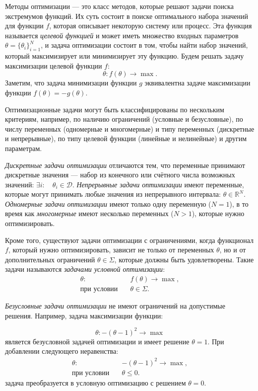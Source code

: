 Методы оптимизации --- это класс методов, которые решают задачи поиска экстремумов функций.
Их суть состоит в поиске оптимального набора значений для функции $f$, которая описывает некоторую систему или процесс.
Эта функция называется \emph{целевой функцией} и может иметь множество входных параметров $\theta = \{\theta_i\}_{i=1}^N$, и задача оптимизации состоит в том, чтобы найти набор значений, который максимизирует или минимизирует эту функцию.
Будем решать задачу максимизации целевой функции $f$:
$$\theta: f(\theta) \to \max.$$
Заметим, что задача минимизации функции $g$ эквивалентна задаче максимизации функции $f(\theta) = -g (\theta)$.

Оптимизационные задачи могут быть классифицированы по нескольким критериям, например, по наличию ограничений (условные и безусловные), по числу переменных (одномерные и многомерные) и типу переменных (дискретные и непрерывные), по типу целевой функции (линейные и нелинейные) и другим параметрам.

\emph{Дискретные задачи оптимизации} отличаются тем, что переменные принимают дискретные значения --- набор из конечного или счётного числа возможных значений: $\exists i:\quad \theta_i \in \mathcal{D}$.
\emph{Непрерывные задачи оптимизации} имеют переменные, которые могут принимать любые значения из непрерывного интервала: $\theta \in \mathbb{R}^N$.
\emph{Одномерные задачи оптимизации} имеют только одну переменную ($N = 1$), в то время как \emph{многомерные} имеют несколько переменных ($N > 1$), которые нужно оптимизировать.

Кроме того, существуют задачи оптимизации с ограничениями, когда функционал $f$, который нужно оптимизировать, зависит не только от переменных $\theta$, но и от дополнительных ограничений $\theta \in \Sigma$, которые должны быть удовлетворены. Такие задачи называются \emph{задачами условной оптимизации}:
\begin{align*}
    \theta:\quad & f(\theta) \to \max, \\        
    \text{при условии}\quad & \theta \in \Sigma.
\end{align*}

\emph{Безусловные задачи оптимизации} не имеют ограничений на допустимые решения. Например, задача максимизации функции:

$$\theta: -(\theta-1)^2 \to \max$$
является безусловной задачей оптимизации и имеет решение $\theta = 1$. При добавлении следующего неравенства:
\begin{align*}
    \theta:\quad & -(\theta-1)^2 \to \max, \\        
    \text{при условии}\quad & \theta \leq 0.
\end{align*}
задача преобразуется в условную оптимизацию с решением $\theta = 0$.

